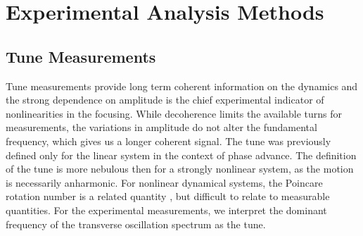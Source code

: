 \chapter{Experimental Analysis Methods} \label{chap:analysis}

\section{Tune Measurements} \label{sec:tune}
Tune measurements provide long term coherent information on the dynamics and the strong dependence on amplitude is the chief experimental indicator of nonlinearities in the focusing. While decoherence limits the available turns for measurements, the variations in amplitude do not alter the fundamental frequency, which gives us a longer coherent signal. The tune was previously defined only for the linear system in the context of phase advance. The definition of the tune is more nebulous then for a strongly nonlinear system, as the motion is necessarily anharmonic. For nonlinear dynamical systems, the Poincare rotation number is a related quantity \cite{nagaitsevBetatronFrequencyPoincare2020}, but difficult to relate to measurable quantities. For the experimental measurements, we interpret the dominant frequency of the transverse oscillation spectrum as the tune. 

